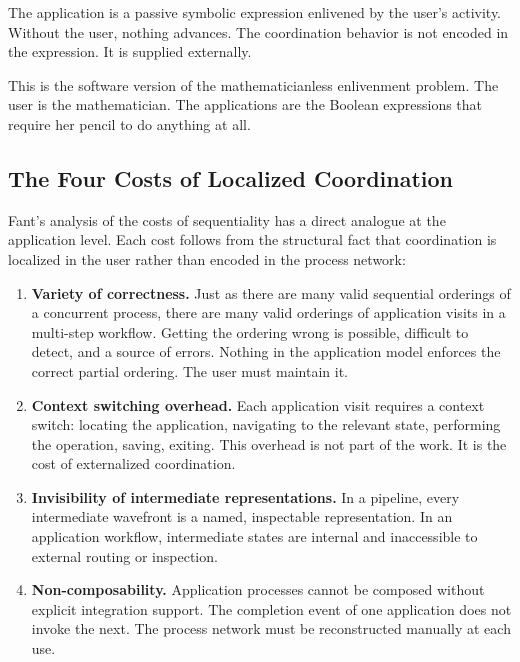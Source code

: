 \documentclass[12pt, a4paper]{article}
\begin{document}
The application is a passive symbolic expression enlivened by the
user's activity. Without the user, nothing advances. The coordination
behavior is not encoded in the expression. It is supplied externally.

This is the software version of the mathematicianless enlivenment
problem. The user is the mathematician. The applications are the
Boolean expressions that require her pencil to do anything at all.

\subsection{The Four Costs of Localized Coordination}

Fant's analysis of the costs of sequentiality has a direct analogue
at the application level. Each cost follows from the structural fact
that coordination is localized in the user rather than encoded in the
process network:

\begin{enumerate}
\item \textbf{Variety of correctness.} Just as there are many valid
  sequential orderings of a concurrent process, there are many valid
  orderings of application visits in a multi-step workflow. Getting
  the ordering wrong is possible, difficult to detect, and a source
  of errors. Nothing in the application model enforces the correct
  partial ordering. The user must maintain it.

\item \textbf{Context switching overhead.} Each application visit
  requires a context switch: locating the application, navigating to
  the relevant state, performing the operation, saving, exiting. This
  overhead is not part of the work. It is the cost of externalized
  coordination.

\item \textbf{Invisibility of intermediate representations.} In a
  pipeline, every intermediate wavefront is a named, inspectable
  representation. In an application workflow, intermediate states
  are internal and inaccessible to external routing or inspection.

\item \textbf{Non-composability.} Application processes cannot be
  composed without explicit integration support. The completion event
  of one application does not invoke the next. The process network
  must be reconstructed manually at each use.
\end{enumerate}
\end{document}
